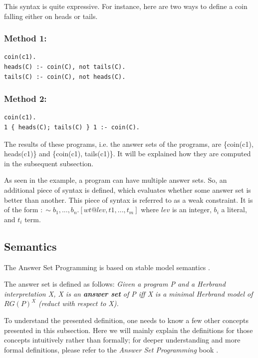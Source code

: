 This syntax is quite expressive. For instance, here are two ways to define a coin falling either on heads or tails.

\subsubsection{Method 1:}
\begin{verbatim}
coin(c1).
heads(C) :- coin(C), not tails(C).
tails(C) :- coin(C), not heads(C).
\end{verbatim}
\subsubsection{Method 2:}
\begin{verbatim}
coin(c1).
1 { heads(C); tails(C) } 1 :- coin(C).
\end{verbatim}

The results of these programs, i.e. the answer sets of the programs, are \{coin(c1), heads(c1)\} and \{coin(c1), tails(c1)\}.
It will be explained how they are computed in the subsequent subsection.

As seen in the example, a program can have multiple answer sets.
So, an additional piece of syntax is defined, which evaluates whether some answer set is better than another.
This piece of syntax is referred to as a weak constraint.
It is of the form $:\sim {} b_1,..., b_n.[wt@lev, t1, ..., t_m]$
where $lev$ is an integer, $b_i$ a literal, and $t_i$ term.

\subsection{Semantics}

The Answer Set Programming is based on stable model semantics \cite{RefWorks:RefID:21-fitting1992michael}.

The answer set is defined as follows: 
\emph{Given a program P and a Herbrand interpretation X, X is an \textbf{answer set} of P iff X is a minimal Herbrand model of $RG(P)^X$ (reduct with respect to X).}

To understand the presented definition, one needs to know a few other concepts presented in this subsection.
Here we will mainly explain the definitions for those concepts intuitively rather than formally; for deeper understanding and more formal definitions, please refer to the \emph{Answer Set Programming} book \cite{RefWorks:RefID:23-lifschitz2019answer}. \\

